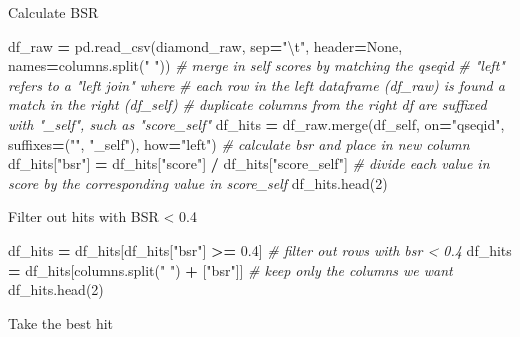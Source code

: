 \documentclass[
]{book}
\newenvironment{Shaded}{\begin{snugshade}}{\end{snugshade}}
\newcommand{\CharTok}[1]{\textcolor[rgb]{0.31,0.60,0.02}{#1}}
\newcommand{\CommentTok}[1]{\textcolor[rgb]{0.56,0.35,0.01}{\textit{#1}}}
\newcommand{\DecValTok}[1]{\textcolor[rgb]{0.00,0.00,0.81}{#1}}
\newcommand{\FloatTok}[1]{\textcolor[rgb]{0.00,0.00,0.81}{#1}}
\newcommand{\NormalTok}[1]{#1}
\newcommand{\OperatorTok}[1]{\textcolor[rgb]{0.81,0.36,0.00}{\textbf{#1}}}
\newcommand{\StringTok}[1]{\textcolor[rgb]{0.31,0.60,0.02}{#1}}
\newcommand{\VariableTok}[1]{\textcolor[rgb]{0.00,0.00,0.00}{#1}}
\begin{document}
Calculate BSR

\begin{Shaded}
\begin{Highlighting}[numbers=left,,]
\NormalTok{df\_raw }\OperatorTok{=}\NormalTok{ pd.read\_csv(diamond\_raw, sep}\OperatorTok{=}\StringTok{"}\CharTok{\textbackslash{}t}\StringTok{"}\NormalTok{, header}\OperatorTok{=}\VariableTok{None}\NormalTok{, names}\OperatorTok{=}\NormalTok{columns.split(}\StringTok{" "}\NormalTok{))}
\CommentTok{\# merge in self scores by matching the qseqid}
\CommentTok{\# "left" refers to a "left join" where}
\CommentTok{\# each row in the left dataframe (df\_raw) is found a match in the right (df\_self)}
\CommentTok{\# duplicate columns from the right df are suffixed with "\_self", such as "score\_self"}
\NormalTok{df\_hits }\OperatorTok{=}\NormalTok{ df\_raw.merge(df\_self, on}\OperatorTok{=}\StringTok{"qseqid"}\NormalTok{, suffixes}\OperatorTok{=}\NormalTok{(}\StringTok{""}\NormalTok{, }\StringTok{"\_self"}\NormalTok{), how}\OperatorTok{=}\StringTok{"left"}\NormalTok{)}
\CommentTok{\# calculate bsr and place in new column}
\NormalTok{df\_hits[}\StringTok{"bsr"}\NormalTok{] }\OperatorTok{=}\NormalTok{ df\_hits[}\StringTok{"score"}\NormalTok{] }\OperatorTok{/}\NormalTok{ df\_hits[}\StringTok{"score\_self"}\NormalTok{] }\CommentTok{\# divide each value in score by the corresponding value in score\_self}
\NormalTok{df\_hits.head(}\DecValTok{2}\NormalTok{)}
\end{Highlighting}
\end{Shaded}

Filter out hits with BSR \textless{} 0.4

\begin{Shaded}
\begin{Highlighting}[numbers=left,,]
\NormalTok{df\_hits }\OperatorTok{=}\NormalTok{ df\_hits[df\_hits[}\StringTok{"bsr"}\NormalTok{] }\OperatorTok{\textgreater{}=} \FloatTok{0.4}\NormalTok{] }\CommentTok{\# filter out rows with bsr \textless{} 0.4}
\NormalTok{df\_hits }\OperatorTok{=}\NormalTok{ df\_hits[columns.split(}\StringTok{" "}\NormalTok{) }\OperatorTok{+}\NormalTok{ [}\StringTok{"bsr"}\NormalTok{]] }\CommentTok{\# keep only the columns we want}
\NormalTok{df\_hits.head(}\DecValTok{2}\NormalTok{)}
\end{Highlighting}
\end{Shaded}

Take the best hit
\end{document}
